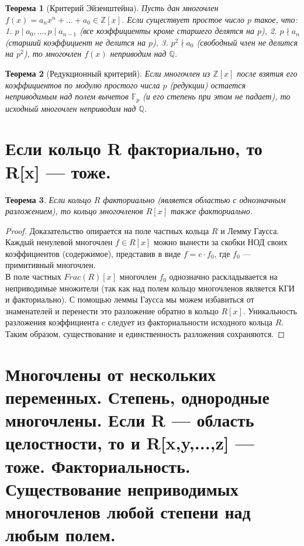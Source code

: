 \documentclass[12pt, a4paper]{article}
\theoremstyle{definition}
\theoremstyle{plain}
\newtheorem{theorem}{Теорема}[section]
\begin{document}
	\begin{theorem}[Критерий Эйзенштейна]
		Пусть дан многочлен $f(x) = a_n x^n + \dots + a_0 \in \mathbb{Z}[x]$. Если существует простое число $p$ такое, что:
		1. $p \mid a_0, \dots, p \mid a_{n-1}$ (все коэффициенты кроме старшего делятся на $p$),
		2. $p \nmid a_n$ (старший коэффициент не делится на $p$),
		3. $p^2 \nmid a_0$ (свободный член не делится на $p^2$),
		то многочлен $f(x)$ неприводим над $\mathbb{Q}$.
	\end{theorem}
	
	\begin{theorem}[Редукционный критерий]
		Если многочлен из $\mathbb{Z}[x]$ после взятия его коэффициентов по модулю простого числа $p$ (редукции) остается неприводимым над полем вычетов $\mathbb{F}_p$ (и его степень при этом не падает), то исходный многочлен неприводим над $\mathbb{Q}$.
	\end{theorem}
	
	\newpage
	\section{Если кольцо R факториально, то R[x] --- тоже.}
	
	\begin{theorem}
		Если кольцо $R$ факториально (является областью с однозначным разложением), то кольцо многочленов $R[x]$ также факториально.
	\end{theorem}
	\begin{proof}
		Доказательство опирается на поле частных кольца $R$ и Лемму Гаусса. Каждый ненулевой многочлен $f \in R[x]$ можно вынести за скобки НОД своих коэффициентов (содержимое), представив в виде $f = c \cdot f_0$, где $f_0$ — примитивный многочлен. \\
		В поле частных $Frac(R)[x]$ многочлен $f_0$ однозначно раскладывается на неприводимые множители (так как над полем кольцо многочленов является КГИ и факториально). С помощью леммы Гаусса мы можем избавиться от знаменателей и перенести это разложение обратно в кольцо $R[x]$. Уникальность разложения коэффициента $c$ следует из факториальности исходного кольца $R$. Таким образом, существование и единственность разложения сохраняются.
	\end{proof}
	
	\newpage
	\section{Многочлены от нескольких переменных. Степень, однородные многочлены. Если R --- область целостности, то и R[x,y,...,z] --- тоже. Факториальность. Существование неприводимых многочленов любой степени над любым полем.}
	
\end{document}
